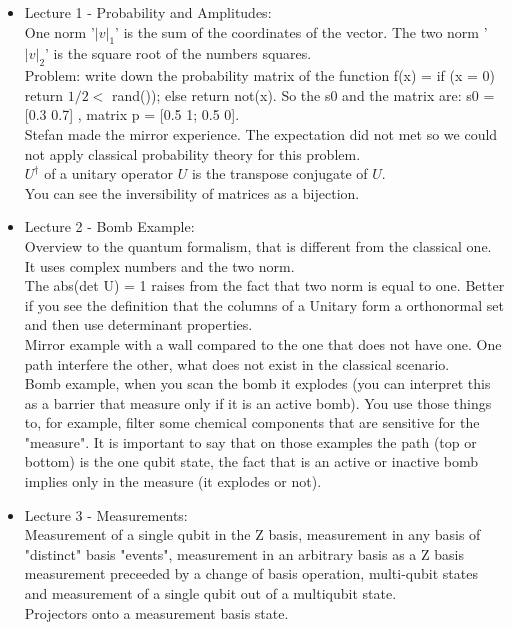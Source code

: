\documentclass{article}
\begin{document}
    \begin{itemize}
    \item {Lecture 1 - Probability and Amplitudes:}\\
    One norm '$|v|_1$' is the sum of the coordinates of the vector. The two norm '$|v|_2$' is the square root of the numbers squares.\\
    Problem: write down the probability matrix of the function f(x) = if (x = 0)  return $1/2 <$ rand()); else return not(x). So the s0 and the matrix are:
    s0 = [0.3 0.7] , matrix p = [0.5 1; 0.5 0].\\
    Stefan made the mirror experience. The expectation did not met so we could not apply classical probability theory for this problem.\\
    $U^{\dag}$ of a unitary operator $U$ is the transpose conjugate of $U$.\\
    You can see the inversibility of matrices as a bijection.\\

    \item {Lecture 2 - Bomb Example:}\\
    Overview to the quantum formalism, that is different from the classical one. It uses complex numbers and the two norm. \\
    The abs(det U) = 1 raises from the fact that two norm is equal to one. Better if you see the definition that the columns of a Unitary form a orthonormal set and then use determinant properties.\\
    Mirror example with a wall compared to the one that does not have one. One path interfere the other, what does not exist in the classical scenario.\\
    Bomb example, when you scan the bomb it explodes (you can interpret this as a barrier that measure only if it is an active bomb). You use those things to, for example, filter some chemical components that are sensitive for the "measure". It is important to say that on those examples the path (top or bottom) is the one qubit state, the fact that is an active or inactive bomb implies only in the measure (it explodes or not).\\

    \item {Lecture 3 - Measurements:}\\
    Measurement of a single qubit in the Z basis, measurement in any basis of "distinct" basis "events", measurement in an arbitrary basis as a Z basis measurement preceeded by a change of basis operation, multi-qubit states and measurement of a single qubit out of a multiqubit state.\\
    Projectors onto a measurement basis state.


\end{itemize}
\end{document}
